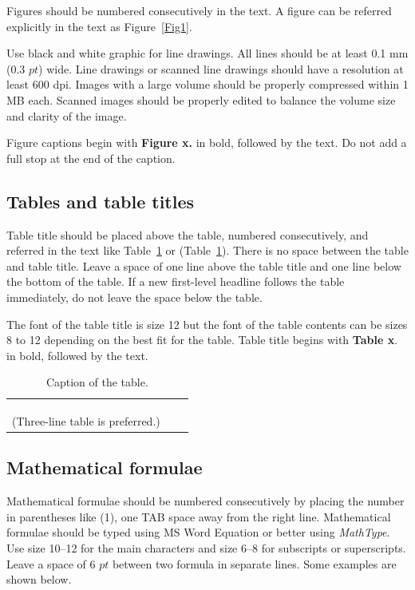 \documentclass{aims}
\numberwithin{equation}{section}
\begin{document}
 
 Figures should be numbered consecutively in the text. A figure can be referred explicitly in the text as Figure~\ref{Fig1}.
 
 Use black and white graphic for line drawings. All lines should be at least 0.1 mm (0.3 $pt$) wide. Line drawings or scanned line drawings should have a resolution at least 600 dpi. Images with a large volume should be properly compressed within 1 MB each. Scanned images should be properly edited to balance the volume size and clarity of the image. 
 
 Figure captions begin with \textbf{Figure x.} in bold, followed by the text. Do not add a full stop at the end of the caption. 

\subsection{Tables and table titles}

Table title should be placed above the table, numbered consecutively, and referred in the text like Table~\ref{table} or (Table~\ref{table}). There is no space between the table and table title. Leave a space of one line above the table title and one line below the bottom of the table. If a new first-level headline follows the table immediately, do not leave the space below the table.

The font of the table title is size 12 but the font of the table contents can be sizes 8 to 12 depending on the best fit for the table. Table title begins with \textbf{Table x}. in bold, followed by the text. 

\begin{table}[H]
\begin{center}
\caption{Caption of the table.}
\begin{tabular}{ccc} \hline
 & & \\\hline
 & & \\
 & & \\
 & & \\\hline
(Three-line table is preferred.)
\end{tabular}
	\label{table}
\end{center}
\end{table}

\subsection{Mathematical formulae}
Mathematical formulae should be numbered consecutively by placing the number in parentheses like (1), one TAB space away from the right line. Mathematical formulae should be typed using MS Word Equation or better using \emph{MathType}. Use size 10--12 for the main characters and size 6--8 for subscripts or superscripts. Leave a space of 6 $pt$ between two formula in separate lines. Some examples are shown below. 
\end{document}

